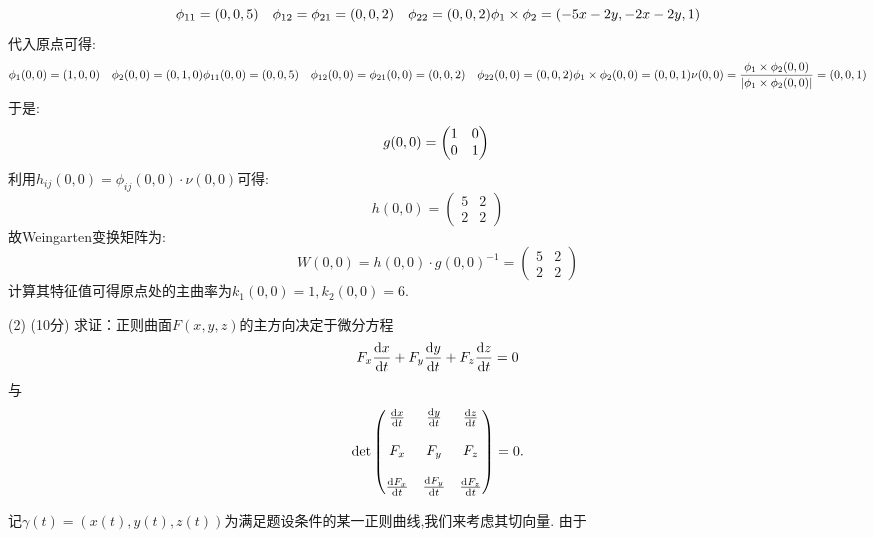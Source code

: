 \begin{itemize}
\begin{proofc}[解]
$$            \phi_{11}=(0,0,5)\quad\phi_{12}=\phi_{21}=(0,0,2)\quad\phi_{22}=(0,0,2)\\
            \phi_{1}\times\phi_{2}=(-5x-2y,-2x-2y,1)
        $$
        代入原点可得:
        $$
        \phi_{1}(0,0)=(1,0,0)\quad\phi_{2}(0,0)=(0,1,0)\\
        \phi_{11}(0,0)=(0,0,5)\quad\phi_{12}(0,0)=\phi_{21}(0,0)=(0,0,2)\quad\phi_{22}(0,0)=(0,0,2)\\
        \phi_{1}\times\phi_{2}(0,0)=(0,0,1)\\
        \nu(0,0)=\frac{\phi_{1}\times\phi_{2}(0,0)}{|\phi_{1}\times\phi_{2}(0,0)|}=(0,0,1)
        $$
        于是:
        $$
            g(0,0)=
            \begin{pmatrix}
                1&0\\
                0&1
            \end{pmatrix}\\
        $$
        利用$h_{ij}(0,0)=\phi_{ij}(0,0)\cdot\nu(0,0)$可得:
        $$
            h(0,0)=
            \begin{pmatrix}
                5&2\\
                2&2
            \end{pmatrix}
        $$
        故Weingarten变换矩阵为:
        $$
            W(0,0)=h(0,0)\cdot g(0,0)^{-1}=
            \begin{pmatrix}
                5&2\\
                2&2
            \end{pmatrix}
        $$
        计算其特征值可得原点处的主曲率为$k_{1}(0,0)=1,k_{2}(0,0)=6$.
    \end{proofc}
    (2) (10分) 求证：正则曲面$F(x,y,z)$的主方向决定于微分方程
    $$
        F_x\frac{{\rm d}x}{{\rm d}t}+F_y\frac{{\rm d}y}{{\rm d}t}+F_z\frac{{\rm d}z}{{\rm d}t}=0
    $$
    与
    \[\det\begin{pmatrix}
        \frac{{\rm d}x}{{\rm d}t}&\frac{{\rm d}y}{{\rm d}t}&\frac{{\rm d}z}{{\rm d}t}\\
         & & \\F_x&F_y&F_z\\ & & \\
        \frac{{\rm d}F_x}{{\rm d}t}&\frac{{\rm d}F_y}{{\rm d}t}&\frac{{\rm d}F_z}{{\rm d}t}
    \end{pmatrix}=0.\]
    \begin{proofc}
        记$\gamma(t)=(x(t),y(t),z(t))$为满足题设条件的某一正则曲线,我们来考虑其切向量.
        由于
        \begin{equation}

\end{equation}
\end{proofc}
\end{itemize}

